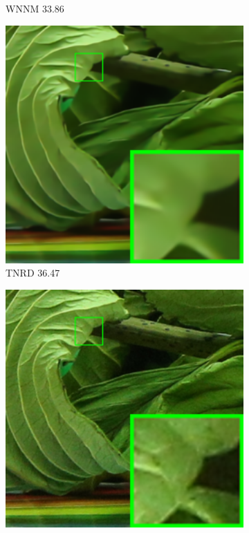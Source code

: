 \begin{figure}
\begin{subfigure}[t]{0.19\textwidth}
\caption{WNNM 33.86}
    \end{subfigure}
    \hfill
    \begin{subfigure}[t]{0.19\textwidth}
        \centering
        \includegraphics[width=1\textwidth]{images/guided/cc15/resize_br_TRD_5dmark3_iso3200_2_real.png}
\caption{TNRD 36.47}
    \end{subfigure}
    \hfill
    \begin{subfigure}[t]{0.19\textwidth}
        \centering
        \includegraphics[width=1\textwidth]{images/guided/cc15/resize_br_DnCNN_5dmark3_iso3200_2_real.png}

\end{subfigure}
\end{figure}
